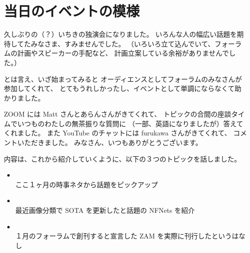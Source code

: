 \documentclass[dvipdfmx,autodetect-engine,10pt,b5paper,papersize,openany,dvipsnames]{jsbook}
\begin{document}
\chapter{当日のイベントの模様}
\label{sec:introduction}


久しぶりの（？）いちきの独演会になりました。
いろんな人の幅広い話題を期待してたみなさま、すみませんでした。
（いろいろ立て込んでいて、フォーラムの計画やスピーカーの手配など、
計画立案している余裕がありませんでした。）

とは言え、いざ始まってみると
オーディエンスとしてフォーラムのみなさんが参加してくれて、
とてもうれしかったし、イベントとして単調にならなくて助かりました。

\vspace{1cm}


ZOOM には Matt さんとあらんさんがきてくれて、
トピックの合間の座談タイムでいつものわたしの無茶振りな質問に
（一部、英語になりましたが）答えてくれました。
また YouTube のチャットには furukawa さんがきてくれて、
コメントいただきました。
みなさん、いつもありがとうございます。


内容は、これから紹介していくように、以下の３つのトピックを話しました。
\begin{itemize}
\item {}\\
  ここ１ヶ月の時事ネタから話題をピックアップ
\item {}\\
  最近画像分類で SOTA を更新したと話題の NFNets を紹介
\item {}\\
  １月のフォーラムで創刊すると宣言した ZAM を実際に刊行したというはなし
\end{itemize}
\end{document}
